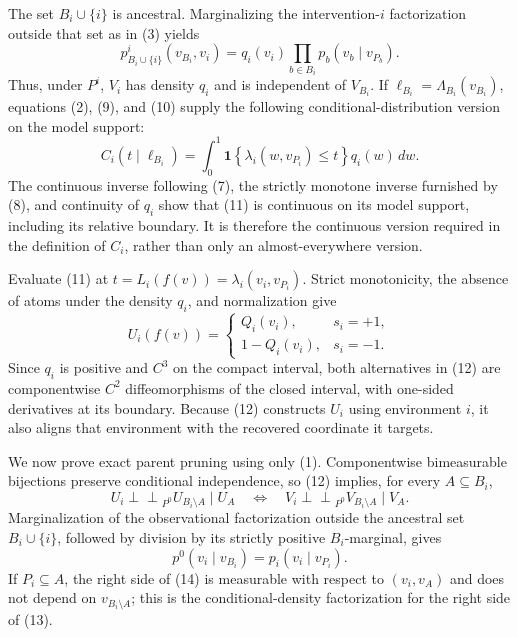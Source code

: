 The set \(B_i\cup\{i\}\) is ancestral.  Marginalizing the intervention-\(i\) factorization outside that set as in (3) yields
\[
 p^i_{B_i\cup\{i\}}(v_{B_i},v_i)
 =q_i(v_i)\prod_{b\in B_i}p_b(v_b\mid v_{P_b}).
\tag{10}
\]
Thus, under \(P^i\), \(V_i\) has density \(q_i\) and is independent of \(V_{B_i}\).  If \(\ell_{B_i}=\Lambda_{B_i}(v_{B_i})\), equations (2), (9), and (10) supply the following conditional-distribution version on the model support:
\[
 C_i(t\mid\ell_{B_i})
 =\int_0^1
 \mathbf 1\!\left\{\lambda_i(w,v_{P_i})\le t\right\}q_i(w)\,dw.
\tag{11}
\]
The continuous inverse following (7), the strictly monotone inverse furnished by (8), and continuity of \(q_i\) show that (11) is continuous on its model support, including its relative boundary.  It is therefore the continuous version required in the definition of \(C_i\), rather than only an almost-everywhere version.

Evaluate (11) at \(t=L_i(f(v))=\lambda_i(v_i,v_{P_i})\).  Strict monotonicity, the absence of atoms under the density \(q_i\), and normalization give
\[
 U_i(f(v))=
 \begin{cases}
 Q_i(v_i),&s_i=+1,\\[3pt]
 1-Q_i(v_i),&s_i=-1.
 \end{cases}
\tag{12}
\]
Since \(q_i\) is positive and \(C^3\) on the compact interval, both alternatives in (12) are componentwise \(C^2\) diffeomorphisms of the closed interval, with one-sided derivatives at its boundary.  Because (12) constructs \(U_i\) using environment \(i\), it also aligns that environment with the recovered coordinate it targets.

We now prove exact parent pruning using only (1).  Componentwise bimeasurable bijections preserve conditional independence, so (12) implies, for every \(A\subseteq B_i\),
\[
 U_i\mathbin{\perp\!\!\!\perp}_{P^0}U_{B_i\setminus A}\mid U_A
 \quad\Longleftrightarrow\quad
 V_i\mathbin{\perp\!\!\!\perp}_{P^0}V_{B_i\setminus A}\mid V_A.
\tag{13}
\]
Marginalization of the observational factorization outside the ancestral set \(B_i\cup\{i\}\), followed by division by its strictly positive \(B_i\)-marginal, gives
\[
 p^0(v_i\mid v_{B_i})=p_i(v_i\mid v_{P_i}).
\tag{14}
\]
If \(P_i\subseteq A\), the right side of (14) is measurable with respect to \((v_i,v_A)\) and does not depend on \(v_{B_i\setminus A}\); this is the conditional-density factorization for the right side of (13).

